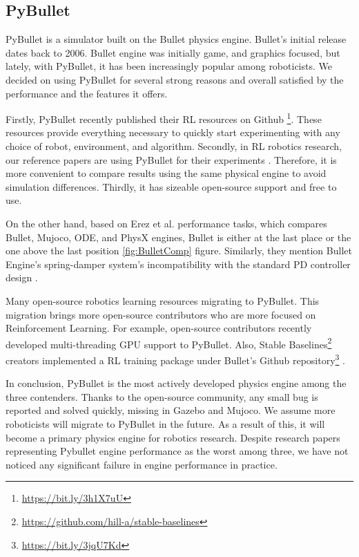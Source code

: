 \subsection{PyBullet}

PyBullet is a simulator built on the Bullet physics engine. Bullet's initial release dates back to 2006. Bullet engine was initially game, and graphics focused, but lately, with PyBullet, it has been increasingly popular among roboticists. We decided on using PyBullet for several strong reasons and overall satisfied by the performance and the features it offers. 

Firstly, PyBullet recently published their RL resources on Github \footnote{\url{https://bit.ly/3h1X7uU}}. These resources provide everything necessary to quickly start experimenting with any choice of robot, environment, and algorithm. Secondly, in RL robotics research, our reference papers are using PyBullet for their experiments \cite{Quillen2018} \cite{Breyer2018}. Therefore, it is more convenient to compare results using the same physical engine to avoid simulation differences. Thirdly, it has sizeable open-source support and free to use. 

On the other hand, based on Erez et al. performance tasks, which compares Bullet, Mujoco, ODE, and PhysX engines, Bullet is either at the last place or the one above the last position \ref{fig:BulletComp} figure. Similarly, they mention Bullet Engine's spring-damper system's incompatibility with the standard PD controller design \cite{Erez2015}.

Many open-source robotics learning resources migrating to PyBullet. This migration brings more open-source contributors who are more focused on Reinforcement Learning. For example, open-source contributors recently developed multi-threading GPU support to PyBullet. Also, Stable Baselines\footnote{\url{https://github.com/hill-a/stable-baselines}} creators implemented a RL training package under Bullet's Github repository\footnote{\url{https://bit.ly/3jqU7Kd}} \cite{stable-baselines}. 

In conclusion, PyBullet is the most actively developed physics engine among the three contenders. Thanks to the open-source community, any small bug is reported and solved quickly, missing in Gazebo and Mujoco. We assume more roboticists will migrate to PyBullet in the future. As a result of this, it will become a primary physics engine for robotics research. Despite research papers representing Pybullet engine performance as the worst among three, we have not noticed any significant failure in engine performance in practice.


